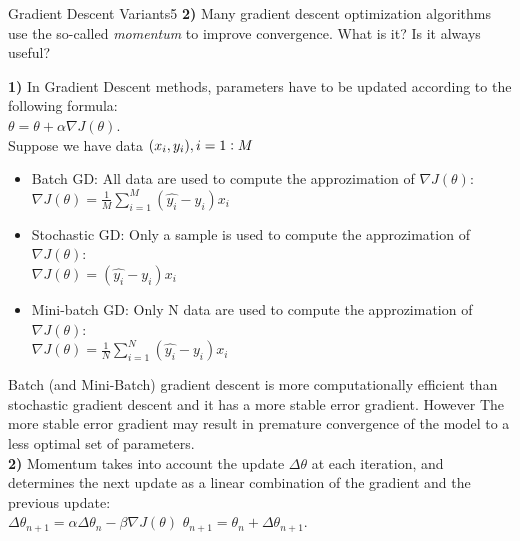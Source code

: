 \begin{questions}
\begin{question}[bonus]{Gradient Descent Variants}{5}
\textbf{2)} Many gradient descent optimization algorithms use the so-called \emph{momentum} to improve convergence. What is it? Is it always useful?

\begin{answer}
\textbf{1)} In Gradient Descent methods, parameters have to be updated according to the following formula: \\ $\theta=\theta + \alpha \nabla J(\theta)$.	\\
Suppose we have data ${(x_i,y_i)}, \\ i=1:M$
\begin{itemize}
	\item Batch GD: All data are used to compute the approzimation of $\nabla J(\theta)$: \\
	$\nabla J(\theta) = \frac{1}{M}\sum \limits _{i=1}^M(\widehat{y_i}-y_i)x_i$
	\item Stochastic GD: Only a sample is used to compute the approzimation of $\nabla J(\theta)$:\\
	$\nabla J(\theta) =(\widehat{y_i}-y_i)x_i$
	\item Mini-batch GD: Only N data are used to compute the approzimation of $\nabla J(\theta)$:\\
	$\nabla J(\theta) = \frac{1}{N}\sum \limits _{i=1}^N(\widehat{y_i}-y_i)x_i$
\end{itemize}
Batch (and Mini-Batch) gradient descent is more computationally efficient than stochastic gradient descent and it has a more stable error gradient. However The more stable error gradient may result in premature convergence of the model to a less optimal set of parameters.\\
\textbf{2)} Momentum takes into account the update $\Delta \theta$ at each iteration, and determines the next update as a linear combination of the gradient and the previous update:\\
$\Delta \theta_{n+1} =\alpha \Delta \theta_n - \beta\nabla J(\theta)$
$\theta_{n+1} = \theta_{n} + \Delta \theta_{n+1}$.
\end{answer}

\end{question}


\end{questions}
